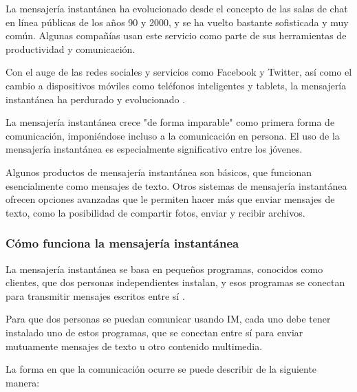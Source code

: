 La mensajería instantánea ha evolucionado desde el concepto de las salas de chat en línea públicas de los años 90 y 2000, y se ha vuelto bastante sofisticada y muy común. Algunas compañías usan este servicio como parte de sus herramientas de productividad y comunicación.

Con el auge de las redes sociales y servicios como Facebook y Twitter, así como el cambio a dispositivos móviles como teléfonos inteligentes y tablets, la mensajería instantánea ha perdurado y evolucionado \cite{im9}.

La mensajería instantánea crece "de forma imparable" como primera forma de comunicación, imponiéndose incluso a la comunicación en persona. El uso de la mensajería instantánea es especialmente significativo entre los jóvenes.

Algunos productos de mensajería instantánea son básicos, que funcionan esencialmente como mensajes de texto. Otros sistemas de mensajería instantánea ofrecen opciones avanzadas que le permiten hacer más que enviar mensajes de texto, como la posibilidad de compartir fotos, enviar y recibir archivos.

\subsubsection{Cómo funciona la mensajería instantánea}

La mensajería instantánea se basa en pequeños programas, conocidos como clientes, que dos personas independientes instalan, y esos programas se conectan para transmitir mensajes escritos entre sí \cite{im8}.

Para que dos personas se puedan comunicar usando IM, cada uno debe tener instalado uno de estos programas, que se conectan entre sí para enviar mutuamente mensajes de texto u otro contenido multimedia.

La forma en que la comunicación ocurre se puede describir de la siguiente manera:

